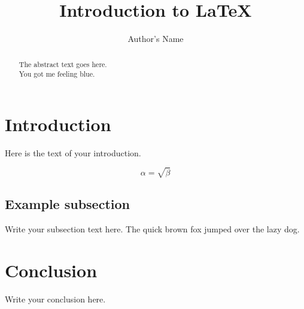 \documentclass{article}
\begin{document}
\title{Introduction to \LaTeX{}}
\author{Author's Name}

\maketitle

\begin{abstract}
The abstract text goes here.\\
You got me feeling blue.
\end{abstract}

\section{Introduction}
Here is the text of your introduction.

\begin{equation}
	\label{simple_equation}
	\alpha = \sqrt{ \beta }
\end{equation}

\subsection{Example subsection}
Write your subsection text here.
The quick brown fox jumped over the lazy dog.

\section{Conclusion}
Write your conclusion here.
\end{document}

